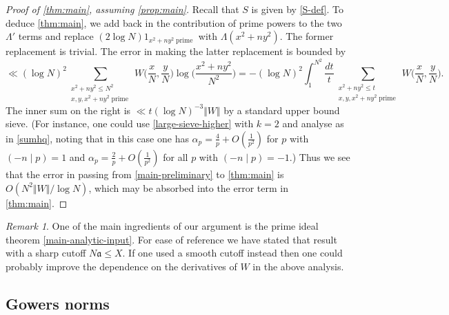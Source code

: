 \documentclass[11pt,reqno]{amsart}
\numberwithin{equation}{section}
\theoremstyle{definition}
\theoremstyle{remark}
\newtheorem*{remark}{Remark}
\newcommand{\mf}{\mathfrak}
\renewcommand{\le}{\leqslant}
\newcommand{\legendre}[2]{(#1 \mid #2)}
\begin{document}
\begin{proof}[Proof of \cref{thm:main}, assuming \cref{prop:main}]
Recall that $S$ is given by \cref{S-def}.
To deduce \cref{thm:main}, we add back in the contribution of prime powers to the two $\Lambda'$ terms and replace $(2\log N) 1_{x^2 + ny^2  \operatorname{prime}}$ with $\Lambda(x^2 + ny^2)$. The former replacement is trivial. The error in making the latter replacement is bounded by 
\[ \ll (\log N)^2\!\!\! \sum_{\substack{ x^2 + ny^2 \le N^2 \\ x, y, x^2 + ny^2 \operatorname{prime}}} \!\!\! W\Big(\frac{x}{N}, \frac{y}{N}\Big) \log \bigg( \frac{x^2 + ny^2}{N^2} \bigg) = -(\log N)^2\int^{N^2}_1 \frac{dt}{t} \!\!\! \sum_{\substack{ x^2 + ny^2 \le t  \\ x, y, x^2 + ny^2 \operatorname{prime}}} \!\!\! W\Big(\frac{x}{N}, \frac{y}{N}\Big). \]
The inner sum on the right is $\ll t(\log N)^{-3} \Vert W \Vert$ by a standard upper bound sieve. (For instance, one could use \cref{large-sieve-higher} with $k = 2$ and analyse as in \cref{sumhq}, noting that in this case one has $\alpha_p = \frac{4}{p} + O(\frac{1}{p^2})$ for $p$ with $\legendre{-n}{p} = 1$ and $\alpha_p = \frac{2}{p} + O(\frac{1}{p^2})$ for all $p$ with $\legendre{-n}{p} = -1$.) Thus we see that the error in passing from \cref{main-preliminary} to \cref{thm:main} is $O(N^2 \Vert W \Vert/\log N)$, which may be absorbed into the error term in \cref{thm:main}.
\end{proof}

\begin{remark}
One of the main ingredients of our argument is the prime ideal theorem \cref{main-analytic-input}. For ease of reference we have stated that result with a sharp cutoff $N \mf{a} \le X$. If one used a smooth cutoff instead then one could probably improve the dependence on the derivatives of $W$ in the above analysis.
\end{remark}

\subsection{Gowers norms}\label{gowers-norms-intro}
\end{document}
